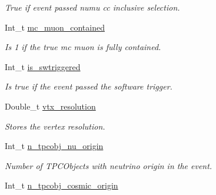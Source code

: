 \begin{DoxyCompactItemize}
\begin{DoxyCompactList}\small\item\em True if event passed numu cc inclusive selection. \end{DoxyCompactList}\item 
\hypertarget{classUBXSecEvent_a350303f94db8bcfdbc2e517713d7ebf9}{Int\-\_\-t \hyperlink{classUBXSecEvent_a350303f94db8bcfdbc2e517713d7ebf9}{mc\-\_\-muon\-\_\-contained}}\label{classUBXSecEvent_a350303f94db8bcfdbc2e517713d7ebf9}

\begin{DoxyCompactList}\small\item\em Is 1 if the true mc muon is fully contained. \end{DoxyCompactList}\item 
\hypertarget{classUBXSecEvent_aedee1ade9f68dfb32fba0b943125f52d}{Int\-\_\-t \hyperlink{classUBXSecEvent_aedee1ade9f68dfb32fba0b943125f52d}{is\-\_\-swtriggered}}\label{classUBXSecEvent_aedee1ade9f68dfb32fba0b943125f52d}

\begin{DoxyCompactList}\small\item\em Is true if the event passed the software trigger. \end{DoxyCompactList}\item 
\hypertarget{classUBXSecEvent_aa6c3a4dd22dfd2d39be8fa74b3703230}{Double\-\_\-t \hyperlink{classUBXSecEvent_aa6c3a4dd22dfd2d39be8fa74b3703230}{vtx\-\_\-resolution}}\label{classUBXSecEvent_aa6c3a4dd22dfd2d39be8fa74b3703230}

\begin{DoxyCompactList}\small\item\em Stores the vertex resolution. \end{DoxyCompactList}\item 
\hypertarget{classUBXSecEvent_a0ae9b16a767089e072f0b82da7e071d4}{Int\-\_\-t \hyperlink{classUBXSecEvent_a0ae9b16a767089e072f0b82da7e071d4}{n\-\_\-tpcobj\-\_\-nu\-\_\-origin}}\label{classUBXSecEvent_a0ae9b16a767089e072f0b82da7e071d4}

\begin{DoxyCompactList}\small\item\em Number of T\-P\-C\-Objects with neutrino origin in the event. \end{DoxyCompactList}\item 
\hypertarget{classUBXSecEvent_a64e81de34497d79043b873862c28fd87}{Int\-\_\-t \hyperlink{classUBXSecEvent_a64e81de34497d79043b873862c28fd87}{n\-\_\-tpcobj\-\_\-cosmic\-\_\-origin}}\label{classUBXSecEvent_a64e81de34497d79043b873862c28fd87}


\end{DoxyCompactItemize}
